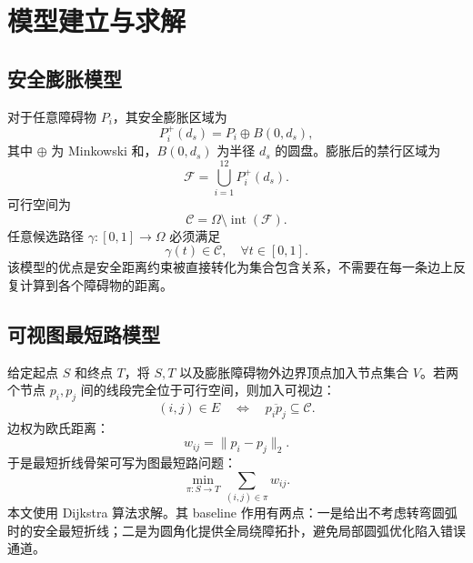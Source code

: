 \documentclass[UTF8,a4paper,12pt]{ctexart}
\begin{document}
\section{模型建立与求解}
\subsection{安全膨胀模型}
对于任意障碍物 $P_i$，其安全膨胀区域为
\begin{equation}
P_i^+(d_s)=P_i\oplus B(0,d_s),
\end{equation}
其中 $\oplus$ 为 Minkowski 和，$B(0,d_s)$ 为半径 $d_s$ 的圆盘。膨胀后的禁行区域为
\begin{equation}
\mathcal{F}=\bigcup_{i=1}^{12}P_i^+(d_s).
\end{equation}
可行空间为
\begin{equation}
\mathcal{C}=\Omega\setminus \operatorname{int}(\mathcal{F}).
\end{equation}
任意候选路径 $\gamma:[0,1]\to\Omega$ 必须满足
\begin{equation}
\gamma(t)\in\mathcal{C},\quad \forall t\in[0,1].
\end{equation}
该模型的优点是安全距离约束被直接转化为集合包含关系，不需要在每一条边上反复计算到各个障碍物的距离。

\subsection{可视图最短路模型}
给定起点 $S$ 和终点 $T$，将 $S,T$ 以及膨胀障碍物外边界顶点加入节点集合 $V$。若两个节点 $p_i,p_j$ 间的线段完全位于可行空间，则加入可视边：
\begin{equation}
(i,j)\in E \quad \Longleftrightarrow \quad \overline{p_i p_j}\subseteq \mathcal{C}.
\end{equation}
边权为欧氏距离：
\begin{equation}
 w_{ij}=\|p_i-p_j\|_2.
\end{equation}
于是最短折线骨架可写为图最短路问题：
\begin{equation}
\min_{\pi:S\to T}\sum_{(i,j)\in\pi}w_{ij}.
\end{equation}
本文使用 Dijkstra 算法求解。其 baseline 作用有两点：一是给出不考虑转弯圆弧时的安全最短折线；二是为圆角化提供全局绕障拓扑，避免局部圆弧优化陷入错误通道。
\end{document}
